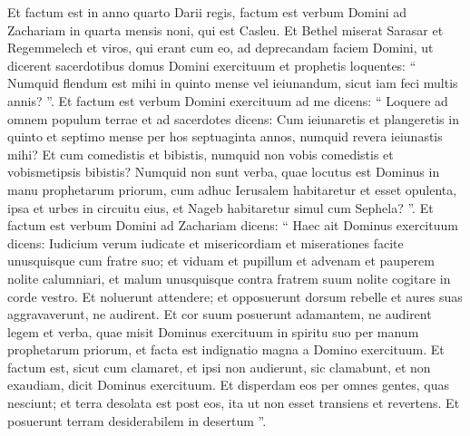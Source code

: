 \begin{biblechapter}
\begin{biblechapter}
\begin{biblechapter}
\begin{biblechapter}
\begin{biblechapter}
\begin{biblechapter}
\begin{biblechapter}
\verse Et factum est in anno quarto Darii regis, factum est verbum Domini ad Zachariam in quarta mensis noni, qui est Casleu. 
\verse Et Bethel miserat Sarasar et Regemmelech et viros, qui erant cum eo, ad deprecandam faciem Domini, 
\verse ut dicerent sacerdotibus domus Domini exercituum et prophetis loquentes: “ Numquid flendum est mihi in quinto mense vel ieiunandum, sicut iam feci multis annis? ”.
 \verse Et factum est verbum Domini exercituum ad me dicens: 
\verse “ Loquere ad omnem populum terrae et ad sacerdotes dicens: Cum ieiunaretis et plangeretis in quinto et septimo mense per hos septuaginta annos, numquid revera ieiunastis mihi? 
 \verse Et cum comedistis et bibistis, numquid non vobis comedistis et vobismetipsis bibistis? 
\verse Numquid non sunt verba, quae locutus est Dominus in manu prophetarum priorum, cum adhuc Ierusalem habitaretur et esset opulenta, ipsa et urbes in circuitu eius, et Nageb habitaretur simul cum Sephela? ”.
 \verse Et factum est verbum Domini ad Zachariam dicens: 
\verse “ Haec ait Dominus exercituum dicens: Iudicium verum iudicate et misericordiam et miserationes facite unusquisque cum fratre suo; 
\verse et viduam et pupillum et advenam et pauperem nolite calumniari, et malum unusquisque contra fratrem suum nolite cogitare in corde vestro. 
\verse Et noluerunt attendere; et opposuerunt dorsum rebelle et aures suas aggravaverunt, ne audirent. 
\verse Et cor suum posuerunt adamantem, ne audirent legem et verba, quae misit Dominus exercituum in spiritu suo per manum prophetarum priorum, et facta est indignatio magna a Domino exercituum. 
\verse Et factum est, sicut cum clamaret, et ipsi non audierunt, sic clamabunt, et non exaudiam, dicit Dominus exercituum. 
\verse Et disperdam eos per omnes gentes, quas nesciunt; et terra desolata est post eos, ita ut non esset transiens et revertens. Et posuerunt terram desiderabilem in desertum ”.
 

\end{biblechapter}
\end{biblechapter}
\end{biblechapter}
\end{biblechapter}
\end{biblechapter}
\end{biblechapter}
\end{biblechapter}
